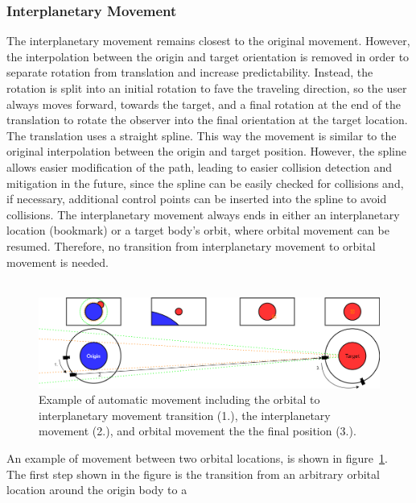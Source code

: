 \subsubsection{Interplanetary Movement}\label{subsubsec:interplanetary-movement}

The interplanetary movement remains closest to the original movement.
However, the interpolation between the origin and target orientation is removed in order to separate rotation from
translation and increase predictability.
Instead, the rotation is split into an initial rotation to fave the traveling direction, so the user always moves
forward, towards the target, and a final rotation at the end of the translation to rotate the observer into the final
orientation at the target location.
\\
The translation uses a straight spline.
This way the movement is similar to the original interpolation between the origin and target position.
However, the spline allows easier modification of the path, leading to easier collision detection and mitigation in
the future, since the spline can be easily checked for collisions and, if necessary, additional control points can be
inserted into the spline to avoid collisions.
The interplanetary movement always ends in either an interplanetary location (bookmark) or a target body's orbit,
where orbital movement can be resumed.
Therefore, no transition from interplanetary movement to orbital movement is needed.
\\
\\
\begin{figure}[h]
    \centering
    \includegraphics[width=\textwidth]{content/4_3_autoNavigation/img/Orbit2OrbitExample}
    \caption{Example of automatic movement including the orbital to interplanetary movement transition (1.), the
    interplanetary movement (2.), and orbital movement the the final position (3.).}
    \label{fig:orbital-example}
\end{figure}
An example of movement between two orbital locations, is shown in figure~\ref{fig:orbital-example}.
\\
The first step shown in the figure is the transition from an arbitrary orbital location around the origin body to a
